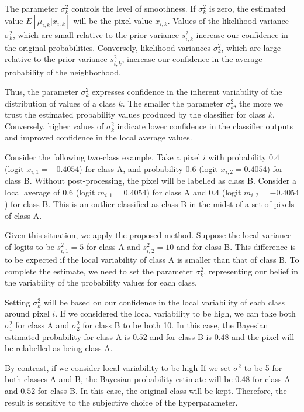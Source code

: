 \documentclass[
  shortnames]{jss}
\begin{document}
The parameter \(\sigma^2_k\) controls the level of smoothness. If \(\sigma^2_k\) is zero, the estimated value \({E}[\mu_{i,k} | x_{i,k}]\) will be the pixel value \(x_{i,k}\). Values of the likelihood variance \(\sigma^2_{k}\), which are small relative to the prior variance \(s^2_{i,k}\) increase our confidence in the original probabilities. Conversely, likelihood variances \(\sigma^2_{k}\), which are large relative to the prior variance \(s^2_{i,k}\), increase our confidence in the average probability of the neighborhood.

Thus, the parameter \(\sigma^2_{k}\) expresses confidence in the inherent variability of the distribution of values of a class \(k\). The smaller the parameter \(\sigma^2_{k}\), the more we trust the estimated probability values produced by the classifier for class \(k\).
Conversely, higher values of \(\sigma^2_{k}\) indicate lower confidence in the classifier outputs and improved confidence in the local average values.

Consider the following two-class example. Take a pixel \(i\) with probability \(0.4\) (logit \(x_{i,1} = -0.4054\)) for class A, and probability \(0.6\) (logit \(x_{i,2} = 0.4054\)) for class B. Without post-processing, the pixel will be labelled as class B. Consider a local average of \(0.6\) (logit \(m_{i,1} = 0.4054\)) for class A and \(0.4\) (logit \(m_{i,2} = -0.4054\)) for class B. This is an outlier classified as class B in the midst of a set of pixels of class A.

Given this situation, we apply the proposed method. Suppose the local variance of logits to be \(s^2_{i,1} = 5\) for class A and \(s^2_{i,2} = 10\) and for class B. This difference is to be expected if the local variability of class A is smaller than that of class B. To complete the estimate, we need to set the parameter \(\sigma^2_{k}\), representing our belief in the variability of the probability values for each class.

Setting \(\sigma^2_{k}\) will be based on our confidence in the local variability of each class around pixel \({i}\). If we considered the local variability to be high, we can take both \(\sigma^2_1\) for class A and \(\sigma^2_2\) for class B to be both 10. In this case, the Bayesian estimated probability for class A is \(0.52\) and for class B is \(0.48\) and the pixel will be relabelled as being class A.

By contrast, if we consider local variability to be high If we set \(\sigma^2\) to be 5 for both classes A and B, the Bayesian probability estimate will be \(0.48\) for class A and \(0.52\) for class B. In this case, the original class will be kept. Therefore, the result is sensitive to the subjective choice of the hyperparameter.
\end{document}
